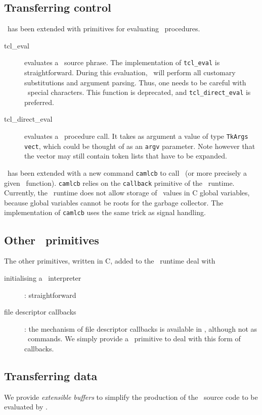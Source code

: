 \subsection{Transferring control}
\caml\ has been extended with primitives for evaluating \tcl\ procedures.
\begin{description}
\item[tcl\_eval] evaluates a \tcl\ source phrase. The implementation of
\verb|tcl_eval| is straightforward.
During this evaluation, \tcl\ will perform all customary substitutions and
argument parsing. Thus, one needs to be careful with \tcl\ special
characters. This function is deprecated, and {\tt tcl\_direct\_eval} is
preferred. 

\item[tcl\_direct\_eval] evaluates a \tcl\ procedure call. It takes as
argument a value of type {\tt TkArgs vect}, which could be thought of as
an {\tt argv} parameter. Note however that the vector may still contain
token lists that have to be expanded.
\end{description} 

\tcl\ has been extended with a new command \verb|camlcb| to call \caml\ (or
more precisely a given \caml\ function). 
\verb|camlcb| relies on the \verb|callback| primitive of the \caml\
runtime. Currently, the \caml\ runtime does not allow storage of \caml\
values in C global variables, because global variables cannot be roots for
the garbage collector. The implementation of \verb|camlcb| uses the same
trick as signal handling.

\subsection{Other \camltk\ primitives}
The other primitives, written in C, added to the \caml\ runtime deal with
\begin{description}
\item[initialising a \tcl\ interpreter] :  straightforward
\item[file descriptor callbacks] : the mechanism of file descriptor
callbacks is available in \tk, although not as \tcl\ commands. We simply
provide a \caml\ primitive to deal with this form of callbacks.
\end{description} 

\subsection{Transferring data}
We provide {\em extensible buffers} to simplify the production of the \tcl\
source code to be evaluated by \tcl.

